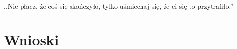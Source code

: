 

\begin{savequote}[70mm]
,,Nie płacz, że coś się skończyło, tylko uśmiechaj się, że ci się to przytrafiło.''
\end{savequote}


\chapter{Wnioski}
\label{chap:wnioski}
